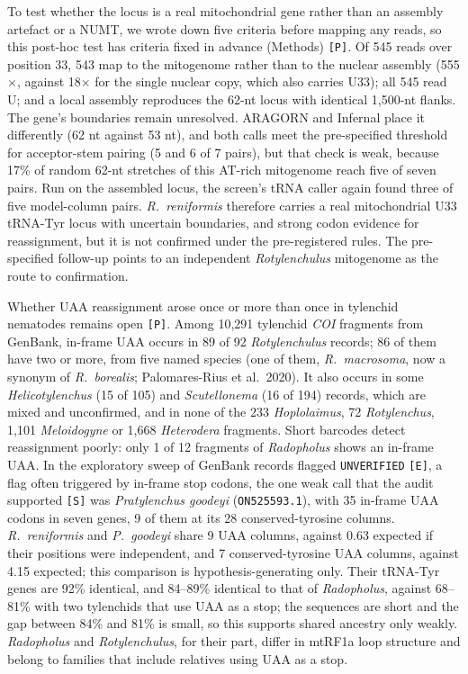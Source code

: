 \documentclass[11pt, a4paper]{article}
\begin{document}
To test whether the locus is a real mitochondrial gene rather than an assembly artefact or a NUMT, we wrote down five criteria before mapping any reads, so this post-hoc test has criteria fixed in advance (Methods) \texttt{[P]}. Of 545 reads over position 33, 543 map to the mitogenome rather than to the nuclear assembly (555$\times$, against 18$\times$ for the single nuclear copy, which also carries U33); all 545 read U; and a local assembly reproduces the 62-nt locus with identical 1,500-nt flanks. The gene's boundaries remain unresolved. ARAGORN and Infernal place it differently (62 nt against 53 nt), and both calls meet the pre-specified threshold for acceptor-stem pairing (5 and 6 of 7 pairs), but that check is weak, because 17\% of random 62-nt stretches of this AT-rich mitogenome reach five of seven pairs. Run on the assembled locus, the screen's tRNA caller again found three of five model-column pairs. \textit{R.\ reniformis} therefore carries a real mitochondrial U33 tRNA-Tyr locus with uncertain boundaries, and strong codon evidence for reassignment, but it is not confirmed under the pre-registered rules. The pre-specified follow-up points to an independent \textit{Rotylenchulus} mitogenome as the route to confirmation.

Whether UAA reassignment arose once or more than once in tylenchid nematodes remains open \texttt{[P]}. Among 10,291 tylenchid \textit{COI} fragments from GenBank, in-frame UAA occurs in 89 of 92 \textit{Rotylenchulus} records; 86 of them have two or more, from five named species (one of them, \textit{R.\ macrosoma}, now a synonym of \textit{R.\ borealis}; Palomares-Rius et al.\ 2020). It also occurs in some \textit{Helicotylenchus} (15 of 105) and \textit{Scutellonema} (16 of 194) records, which are mixed and unconfirmed, and in none of the 233 \textit{Hoplolaimus}, 72 \textit{Rotylenchus}, 1,101 \textit{Meloidogyne} or 1,668 \textit{Heterodera} fragments. Short barcodes detect reassignment poorly: only 1 of 12 fragments of \textit{Radopholus} shows an in-frame UAA. In the exploratory sweep of GenBank records flagged \texttt{UNVERIFIED} \texttt{[E]}, a flag often triggered by in-frame stop codons, the one weak call that the audit supported \texttt{[S]} was \textit{Pratylenchus goodeyi} (\texttt{ON525593.1}), with 35 in-frame UAA codons in seven genes, 9 of them at its 28 conserved-tyrosine columns. \textit{R.\ reniformis} and \textit{P.\ goodeyi} share 9 UAA columns, against 0.63 expected if their positions were independent, and 7 conserved-tyrosine UAA columns, against 4.15 expected; this comparison is hypothesis-generating only. Their tRNA-Tyr genes are 92\% identical, and 84--89\% identical to that of \textit{Radopholus}, against 68--81\% with two tylenchids that use UAA as a stop; the sequences are short and the gap between 84\% and 81\% is small, so this supports shared ancestry only weakly. \textit{Radopholus} and \textit{Rotylenchulus}, for their part, differ in mtRF1a loop structure and belong to families that include relatives using UAA as a stop.
\end{document}
